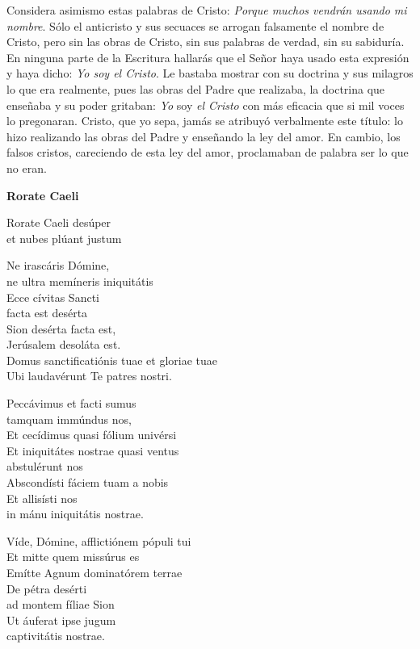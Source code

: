 Considera asimismo estas palabras de Cristo: \emph{Porque muchos vendrán usando mi nombre}. Sólo el anticristo y sus secuaces se arrogan falsamente el nombre de Cristo, pero sin las obras de Cristo, sin sus palabras de verdad, sin su sabiduría. En ninguna parte de la Escritura hallarás que el Señor haya usado esta expresión y haya dicho: \emph{Yo soy el Cristo}. Le bastaba mostrar con su doctrina y sus milagros lo que era realmente, pues las obras del Padre que realizaba, la doctrina que enseñaba y su poder gritaban: \emph{Yo} soy \emph{el Cristo} con más eficacia que si mil voces lo pregonaran. Cristo, que yo sepa, jamás se atribuyó verbalmente este título: lo hizo realizando las obras del Padre y enseñando la ley del amor. En cambio, los falsos cristos, careciendo de esta ley del amor, proclamaban de palabra ser lo que no eran.

\textbf{Rorate Caeli}

Rorate Caeli desúper\\ et nubes plúant justum

Ne irascáris Dómine,\\ ne ultra memíneris iniquitátis\\ Ecce cívitas Sancti\\ facta est desérta\\ Sion desérta facta est,\\ Jerúsalem desoláta est.\\ Domus sanctificatiónis tuae et gloriae tuae\\ Ubi laudavérunt Te patres nostri.

Peccávimus et facti sumus\\ tamquam immúndus nos,\\ Et cecídimus quasi fólium univérsi\\ Et iniquitátes nostrae quasi ventus\\ abstulérunt nos\\ Abscondísti fáciem tuam a nobis\\ Et allisísti nos\\ in mánu iniquitátis nostrae.

Víde, Dómine, afflictiónem pópuli tui\\ Et mitte quem missúrus es\\ Emítte Agnum dominatórem terrae\\ De pétra desérti\\ ad montem fíliae Sion\\ Ut áuferat ipse jugum\\ captivitátis nostrae.

